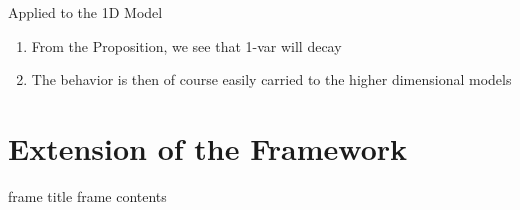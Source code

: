\documentclass[aspectratio=169,  notheorems, sOuRcEs]{RUCPresentation}
\begin{document}
\begin{frame}{Applied to the 1D Model}

    \begin{enumerate}
        \item From the Proposition, we see that 1-var will decay
        \item The behavior is then of course easily carried to the higher
            dimensional models
    \end{enumerate}

\end{frame}


\section{Extension of the Framework}
\begin{frame}{frame title}
    frame contents
\end{frame}
\end{document}
